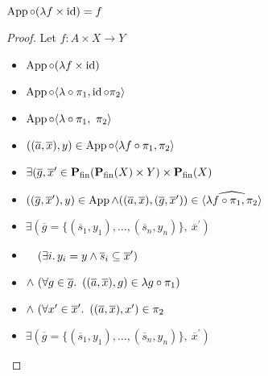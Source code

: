 \begin{prop}
  $\operatorname{App}\circ(\lambda f\times\operatorname{id}) = f$
  \begin{proof}
    Let $f : A\times X\to Y$
    \begin{itemize}
      \item[\phs]
        $\operatorname{App}\circ(\lambda f\times\operatorname{id})$

      \item[\eqs]
        $\operatorname{App}\circ\langle\lambda\circ\pi_1,\operatorname{id}\circ\pi_2\rangle$

      \item[\eqs]
        $\operatorname{App}\circ\langle\lambda\circ\pi_1,~\pi_2\rangle$

      \item[\phantom{\imps}]
        $((\overline{a},\overline{x}), y)\in\operatorname{App}\circ\langle\lambda f\circ\pi_1,\pi_2\rangle$

      \item[\iffs]
        $\exists(\overline{g},\overline{x}^\prime\in\mathbf{P}_{\operatorname{fin}}(\mathbf{P}_{\operatorname{fin}}(X)\times Y)\times\mathbf{P}_{\operatorname{fin}}(X)$

      \addtolength{\itemsep}{-.4\baselineskip}
      \item[\phantom{\imps}]
        \quad$((\overline{g},\overline{x}^\prime), y)\in\operatorname{App}\land((\overline{a},\overline{x}),(\overline{g},\overline{x}^\prime))\in\widehat{\langle\lambda f\circ\pi_1,\pi_2\rangle}$

      \addtolength{\itemsep}{.4\baselineskip}

      \item[\iffs]
        $\exists(\overline{g} = \{(\overline{s}_1,y_1),\ldots,(\overline{s}_n,y_n)\},~\overline{x}^\prime)$

      \addtolength{\itemsep}{-.4\baselineskip}
      \item[\phantom{\imps}]
        \quad$\phantom{\land}~(\exists i\ldotp y_i=y\land\overline{s}_i\subseteq\overline{x}^\prime)$

      \item[\phantom{\imps}]
        \quad$\land~(\forall g\in\overline{g}\ldotp~((\overline{a},\overline{x}),g)\in\lambda g\circ\pi_1)$

      \item[\phantom{\imps}]
        \quad$\land~(\forall x^\prime\in\overline{x}^\prime\ldotp~((\overline{a},\overline{x}), x^\prime)\in\pi_2$
      \addtolength{\itemsep}{.4\baselineskip}

      \item[\iffs]
        $\exists(\overline{g} = \{(\overline{s}_1,y_1),\ldots,(\overline{s}_n,y_n)\},~\overline{x}^\prime)$


\end{itemize}
\end{proof}
\end{prop}

